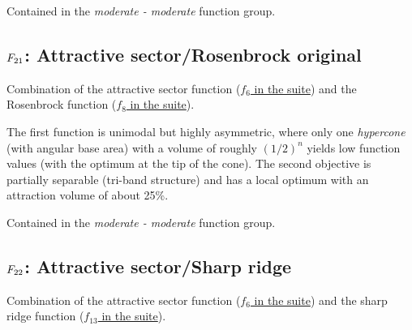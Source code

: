 Contained in the \emph{moderate - moderate} function group.



\subsection[\texorpdfstring{\protect\(F_{21}\protect\): Attractive sector/Rosenbrock original}{F21: Attractive sector/Rosenbrock original}]{\texorpdfstring{\protect\(F_{21}\protect\): Attractive sector/Rosenbrock original}{}}
\label{index:f21}\label{index:attractive-sector-rosenbrock-original}
Combination of the attractive sector function (\href{https://coco.gforge.inria.fr/downloads/download16.00/bbobdocfunctions.pdf\#page=30}{\(f_6\) in the \bbob suite}) and the Rosenbrock function (\href{https://coco.gforge.inria.fr/downloads/download16.00/bbobdocfunctions.pdf\#page=40}{\(f_8\) in the \bbob suite}).

The first function is unimodal but highly asymmetric, where only one
\emph{hypercone} (with angular base area) with a volume of
roughly \((1/2)^n\) yields low function values (with the
optimum at the tip of the cone). The second
objective is partially separable (tri-band structure) and has a local
optimum with an attraction volume of about 25\%.

Contained in the \emph{moderate - moderate} function group.



\subsection[\texorpdfstring{\protect\(F_{22}\protect\): Attractive sector/Sharp ridge}{F22: Attractive sector/Sharp ridge}]{\texorpdfstring{\protect\(F_{22}\protect\): Attractive sector/Sharp ridge}{}}
\label{index:f22}\label{index:attractive-sector-sharp-ridge}
Combination of the attractive sector function (\href{https://coco.gforge.inria.fr/downloads/download16.00/bbobdocfunctions.pdf\#page=30}{\(f_6\) in the \bbob suite}) and the sharp ridge function (\href{https://coco.gforge.inria.fr/downloads/download16.00/bbobdocfunctions.pdf\#page=65}{\(f_{13}\) in the \bbob suite}).

